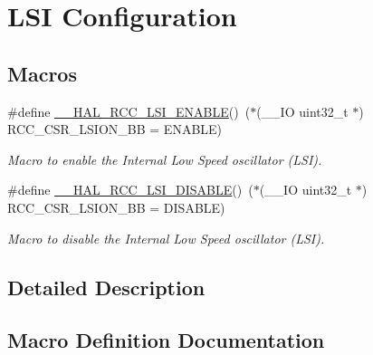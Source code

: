 \hypertarget{group___r_c_c___l_s_i___configuration}{}\section{L\+SI Configuration}
\label{group___r_c_c___l_s_i___configuration}
\subsection*{Macros}
\begin{DoxyCompactItemize}
\item 
\#define \hyperlink{group___r_c_c___l_s_i___configuration_ga560de8b8991db4a296de878a7a8aa58b}{\+\_\+\+\_\+\+H\+A\+L\+\_\+\+R\+C\+C\+\_\+\+L\+S\+I\+\_\+\+E\+N\+A\+B\+LE}()~($\ast$(\+\_\+\+\_\+\+IO uint32\+\_\+t $\ast$) R\+C\+C\+\_\+\+C\+S\+R\+\_\+\+L\+S\+I\+O\+N\+\_\+\+BB = E\+N\+A\+B\+LE)
\begin{DoxyCompactList}\small\item\em Macro to enable the Internal Low Speed oscillator (L\+SI). \end{DoxyCompactList}\item 
\#define \hyperlink{group___r_c_c___l_s_i___configuration_ga4f96095bb4acda60b7f66d5d927da181}{\+\_\+\+\_\+\+H\+A\+L\+\_\+\+R\+C\+C\+\_\+\+L\+S\+I\+\_\+\+D\+I\+S\+A\+B\+LE}()~($\ast$(\+\_\+\+\_\+\+IO uint32\+\_\+t $\ast$) R\+C\+C\+\_\+\+C\+S\+R\+\_\+\+L\+S\+I\+O\+N\+\_\+\+BB = D\+I\+S\+A\+B\+LE)
\begin{DoxyCompactList}\small\item\em Macro to disable the Internal Low Speed oscillator (L\+SI). \end{DoxyCompactList}\end{DoxyCompactItemize}


\subsection{Detailed Description}


\subsection{Macro Definition Documentation}
\mbox{\label{group___r_c_c___l_s_i___configuration_ga4f96095bb4acda60b7f66d5d927da181}} 
